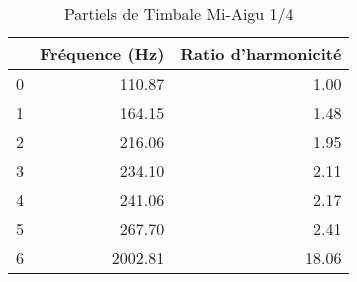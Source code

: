 \begin{table}
\centering
\caption{Partiels de Timbale Mi-Aigu 1/4}
\label{table:partiels-timbale-miaigu-1.wav}
\begin{tabular}{lrr}
\toprule
{} &  Fréquence (Hz) &  Ratio d'harmonicité \\
\midrule
0 &          110.87 &                 1.00 \\
1 &          164.15 &                 1.48 \\
2 &          216.06 &                 1.95 \\
3 &          234.10 &                 2.11 \\
4 &          241.06 &                 2.17 \\
5 &          267.70 &                 2.41 \\
6 &         2002.81 &                18.06 \\
\bottomrule
\end{tabular}
\end{table}
